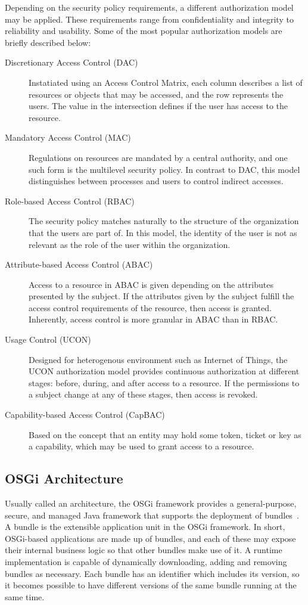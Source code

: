 \documentclass[12pt]{article}
\begin{document}
Depending on the security policy requirements, a different authorization model may be applied. These requirements range from confidentiality and integrity to reliability and usability. Some of the most popular authorization models are briefly described below:

\begin{description}
\item[Discretionary Access Control (DAC)] Instatiated using an Access Control Matrix, each column describes a list of resources or objects that may be accessed, and the row represents the users. The value in the intersection defines if the user has access to the resource.
\item[Mandatory Access Control (MAC)] Regulations on resources are mandated by a central authority, and one such form is the multilevel security policy. In contrast to DAC, this model distinguishes between processes and users to control indirect accesses.
\item[Role-based Access Control (RBAC)] The security policy matches naturally to the structure of the organization that the users are part of. In this model, the identity of the user is not as relevant as the role of the user within the organization.
\item[Attribute-based Access Control (ABAC)] Access to a resource in ABAC is given depending on the attributes presented by the subject. If the attributes given by the subject fulfill the access control requirements of the resource, then access is granted. Inherently, access control is more granular in ABAC than in RBAC.
\item[Usage Control (UCON)] Designed for heterogenous environment such as Internet of Things, the UCON authorization model provides continuous authorization at different stages: before, during, and after access to a resource. If the permissions to a subject change at any of these stages, then access is revoked. 
\item[Capability-based Access Control (CapBAC)] Based on the concept that an entity may hold some token, ticket or key as a capability, which may be used to grant access to a resource. 
\end{description}

\subsection{OSGi Architecture}

Usually called an architecture, the OSGi framework provides a general-purpose, secure, and managed Java framework that supports the deployment of bundles~\cite{osgi_core}. A bundle is the extensible application unit in the OSGi framework. In short, OSGi-based applications are made up of bundles, and each of these may expose their internal business logic so that other bundles make use of it. A runtime implementation is capable of dynamically downloading, adding and removing bundles as necessary. Each bundle has an identifier which includes its version, so it becomes possible to have different versions of the same bundle running at the same time. 
\end{document}
